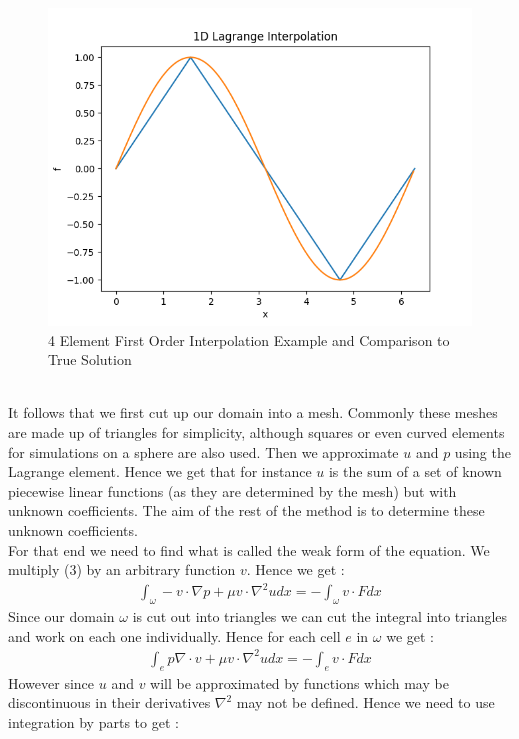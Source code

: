 \documentclass[11pt,twoside,a4paper]{article}
\begin{document}
\begin{figure}
  \includegraphics[width=\linewidth]{ex_1D_LG.png}
  \caption{4 Element First Order Interpolation Example and Comparison to True Solution}
\end{figure}
\\
It follows that we first cut up our domain into a mesh. Commonly these meshes are made up of triangles for simplicity, although squares or even curved elements for simulations on a sphere are also used. Then we approximate $u$ and $p$ using the Lagrange element. Hence we get that for instance $u$ is the sum of a set of known piecewise linear functions (as they are determined by the mesh) but with unknown coefficients. The aim of the rest of the method is to determine these unknown coefficients.\\
For that end we need to find what is called the weak form of the equation. We multiply (3) by an arbitrary function $v$. Hence we get :
\begin{align*}
\int_{\omega} -v \cdot \nabla p + \mu v \cdot \nabla^2 u dx = -\int_{\omega} v \cdot F dx
\end{align*}
Since our domain $\omega$ is cut out into triangles we can cut the integral into triangles and work on each one individually. Hence for each cell $e$ in $\omega$ we get :
\begin{align*}
\int_{e} p \nabla \cdot v + \mu v \cdot \nabla^2 u dx =  -\int_{e} v \cdot F dx
\end{align*}
However since $u$ and $v$ will be approximated by functions which may be discontinuous in their derivatives $\nabla^2$ may not be defined. Hence we need to use integration by parts to get :
\end{document}
